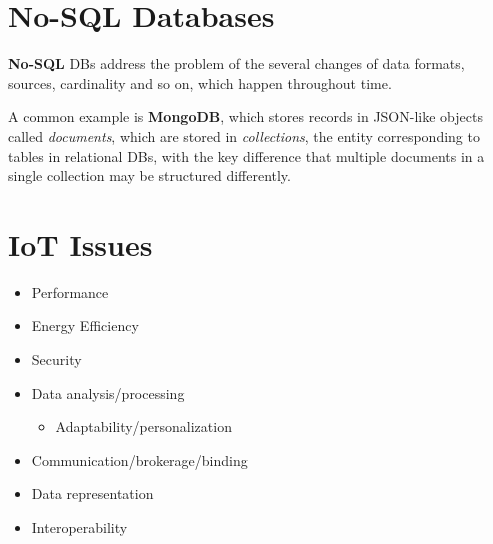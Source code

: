 \section{No-SQL Databases}
\textbf{No-SQL} DBs address the problem of the several changes of data formats, sources, cardinality and so on, which happen throughout time.

A common example is \textbf{MongoDB}, which stores records in JSON-like objects called \textit{documents}, which are stored in \textit{collections}, the entity corresponding to tables in relational DBs,
with the key difference that multiple documents in a single collection may be structured differently.

\section{IoT Issues}
\begin{paracol}{2}
   
   \begin{itemize}
      \item Performance
   \item Energy Efficiency
   \item Security
   \item Data analysis/processing
   \begin{itemize}
      \item Adaptability/personalization
   \end{itemize}
\end{itemize}
\switchcolumn

\begin{itemize}
   \item Communication/brokerage/binding
   \item Data representation
   \item Interoperability
   \end{itemize}
\end{paracol}

